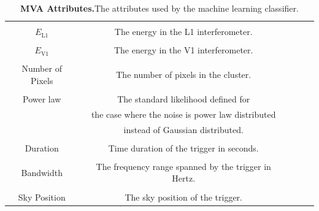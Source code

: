 \documentclass[11pt]{cuthesis}
\begin{document}
\begin{table}
\begin{tabular}{| c | c | c | c | c |}
\hline
& \\
$E_\text{L1}$& The energy in the L1 interferometer. \\

\hline
& \\
$E_\text{V1}$& The energy in the V1 interferometer. \\

\hline
& \\
Number of Pixels & The number of pixels in the cluster. \\

\hline
& \\ 
Power law & The standard likelihood defined for \\ &the case where the noise is power law distributed\\ &instead of Gaussian distributed. \\

\hline
& \\
Duration & Time duration of the trigger in seconds. \\

\hline
& \\
Bandwidth & The frequency range spanned by the trigger in Hertz. \\


\hline
& \\
Sky Position & The sky position of the trigger. \\



\hline
\hline
\end{tabular}
\caption{\textbf{MVA Attributes.}The attributes used by the machine learning classifier.}
\label{coherent energy table}
\end{table}

\FloatBarrier
\end{document}
